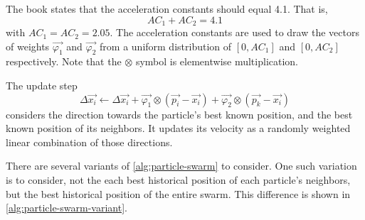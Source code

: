 \documentclass[12pt]{article}
\begin{document}
The book states that the acceleration constants should equal 4.1. That is,
\[AC_1 + AC_2 = 4.1\]
with $AC_1 = AC_2 = 2.05$.
The acceleration constants are used to draw the vectors of weights $\vec{\varphi_1}$ and $\vec{\varphi_2}$ from a uniform distribution of $[0, AC_1]$ and $[0, AC_2]$ respectively.
Note that the $\otimes$ symbol is elementwise multiplication.

The update step
\begin{equation}
    \Delta\vec{x_i} \gets \Delta\vec{x_i} + \vec{\varphi_1} \otimes (\vec{p_i} - \vec{x_i}) + \vec{\varphi_2} \otimes (\vec{p_k} - \vec{x_i})\label{eq:pso:update}
\end{equation}
considers the direction towards the particle's best known position, and the best known position of its neighbors.
It updates its velocity as a randomly weighted linear combination of those directions.

There are several variants of \autoref{alg:particle-swarm} to consider.
One such variation is to consider, not the each best historical position of each particle's neighbors, but the best historical position of the entire swarm.
This difference is shown in \autoref{alg:particle-swarm-variant}.
\end{document}
